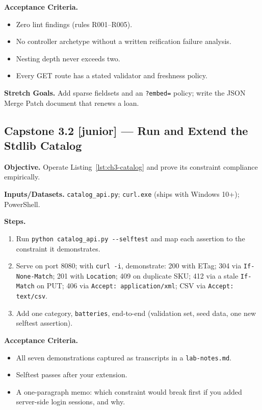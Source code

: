 \textbf{Acceptance Criteria.}
\begin{itemize}
  \item[$\square$] Zero lint findings (rules R001--R005).
  \item[$\square$] No controller archetype without a written reification
        failure analysis.
  \item[$\square$] Nesting depth never exceeds two.
  \item[$\square$] Every GET route has a stated validator and freshness policy.
\end{itemize}

\textbf{Stretch Goals.} Add sparse fieldsets and an \texttt{?embed=} policy;
write the JSON Merge Patch document that renews a loan.

\subsection{Capstone 3.2 [junior] --- Run and Extend the Stdlib Catalog}

\textbf{Objective.} Operate Listing~\ref{lst:ch3-catalog} and prove its
constraint compliance empirically.

\textbf{Inputs/Datasets.} \texttt{catalog\_api.py}; \texttt{curl.exe} (ships
with Windows 10+); PowerShell.

\textbf{Steps.}
\begin{enumerate}
  \item Run \texttt{python catalog\_api.py -{}-selftest} and map each assertion
        to the constraint it demonstrates.
  \item Serve on port 8080; with \texttt{curl -i}, demonstrate: 200 with ETag;
        304 via \texttt{If-None-Match}; 201 with \texttt{Location}; 409 on
        duplicate SKU; 412 via a stale \texttt{If-Match} on PUT; 406 via
        \texttt{Accept: application/xml}; CSV via \texttt{Accept: text/csv}.
  \item Add one category, \texttt{batteries}, end-to-end (validation set, seed
        data, one new selftest assertion).
\end{enumerate}

\textbf{Acceptance Criteria.}
\begin{itemize}
  \item[$\square$] All seven demonstrations captured as transcripts in a
        \texttt{lab-notes.md}.
  \item[$\square$] Selftest passes after your extension.
  \item[$\square$] A one-paragraph memo: which constraint would break first if
        you added server-side login sessions, and why.
\end{itemize}

